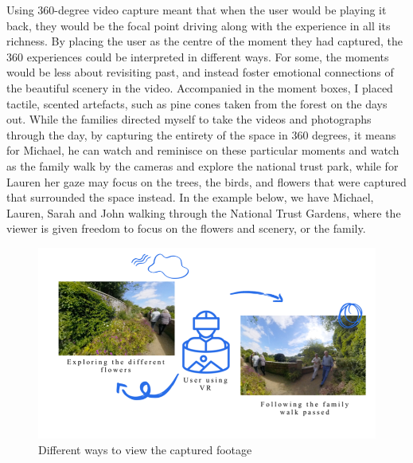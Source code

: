 Using 360-degree video capture meant that when the user would be playing it back, they would be the focal point driving along with the experience in all its richness. By placing the user as the centre of the moment they had captured, the 360 experiences could be interpreted in different ways. For some, the moments would be less about revisiting past, and instead foster emotional connections of the beautiful scenery in the video. Accompanied in the moment boxes, I placed tactile, scented artefacts, such as pine cones taken from the forest on the days out. While the families directed myself to take the videos and photographs through the day, by capturing the entirety of the space in 360 degrees, it means for Michael, he can watch and reminisce on these particular moments and watch as the family walk by the cameras and explore the national trust park, while for Lauren her gaze may focus on the trees, the birds, and flowers that were captured that surrounded the space instead. In the example below, we have Michael, Lauren, Sarah and John walking through the National Trust Gardens, where the viewer is given freedom to focus on the flowers and scenery, or the family.
 
\begin{figure}
\centering
\includegraphics[width=.8\linewidth]{Images/ChapterFour/WaysToViewCapturedFootage.png}
\caption{Different ways to view the captured footage}
\label{fig:capturedFootage}
\end{figure}

